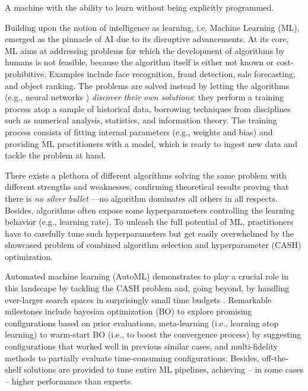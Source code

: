 \documentclass[a4paper,12pt,times,numbered,print,index]{Classes/PhDThesisPSnPDF}
\begin{document}
\begin{definition}
A machine with the ability to learn without being explicitly programmed.
\end{definition}
Building upon the notion of intelligence as learning, i.e. Machine Learning (ML), emerged as the pinnacle of AI due to its disruptive advancements.
At its core, ML aims at addressing problems for which the development of algorithms by humans is not feasible, because the algorithm itself is either not known or cost-prohibitive.
Examples include face recognition, fraud detection, sale forecasting, and object ranking. 
The problems are solved instead by letting the algorithms (e.g., neural networks \cite{}) \textit{discover their own solutions}: they perform a training process atop a sample of historical data, borrowing techniques from disciplines such as numerical analysis, statistics, and information theory.
The training process consists of fitting internal parameters (e.g., weights and bias) and providing ML practitioners with a model, which is ready to ingest new data and tackle the problem at hand.

There exists a plethora of different algorithms solving the same problem with different strengths and weaknesses, confirming theoretical results proving that there is \textit{no silver bullet} \cite{kerschke2019automated}---no algorithm dominates all others in all respects.
Besides, algorithms often expose some hyperparameters controlling the learning behavior (e.g., learning rate). 
To unleash the full potential of ML, practitioners have to carefully tune such hyperparameters but get easily overwhelmed by the showcased problem of combined algorithm selection and hyperparameter (CASH) optimization.

Automated machine learning (AutoML) demonstrates to play a crucial role in this landscape by tackling the CASH problem and, going beyond, by handling ever-larger search spaces in surprisingly small time budgets \cite{}.
Remarkable milestones include bayesian optimization (BO) to explore promising configurations based on prior evaluations,
meta-learning (i.e., learning atop learning) to warm-start BO (i.e., to boost the convergence process) by suggesting configurations that worked well in previous similar cases, and multi-fidelity methods to partially evaluate time-consuming configurations.
Besides, off-the-shelf solutions \cite{} are provided to tune entire ML pipelines, achieving -- in some cases -- higher performance than experts.
\end{document}
